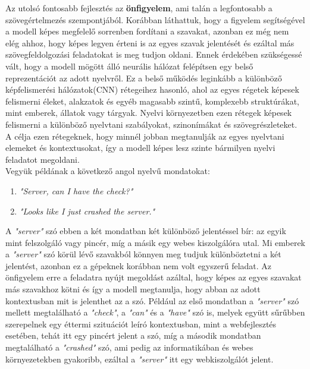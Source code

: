 Az utolsó fontosabb fejlesztés az \textbf{önfigyelem}, ami talán a legfontosabb a szövegértelmezés szempontjából. Korábban láthattuk, hogy a figyelem segítségével a modell képes megfelelő sorrenben fordítani a szavakat, azonban ez még nem elég ahhoz, hogy képes legyen érteni is az egyes szavak jelentését és ezáltal más szövegfeldolgozási feladatokat is meg tudjon oldani. Ennek érdekében szükségessé vált, hogy a modell mögött álló neurális hálózat felépítsen egy belső reprezentációt az adott nyelvről. Ez a belső működés leginkább a különböző képfelismerési hálózatok(CNN) rétegeihez hasonló, ahol az egyes régetek képesek felismerni éleket, alakzatok és egyéb magasabb szintű, komplexebb struktúrákat, mint emberek, állatok vagy tárgyak. Nyelvi környezetben ezen rétegek képesek felismerni a különböző nyelvtani szabályokat, szinonímákat és szövegrészleteket. A célja ezen rétegeknek, hogy minnél jobban megtanulják az egyes nyelvtani elemeket és kontextusokat, így a modell képes lesz szinte bármilyen nyelvi feladatot megoldani.\\
Vegyük példának a következő angol nyelvű mondatokat:

\begin{enumerate}
\item \textit{"Server, can I have the check?"}
\item \textit{"Looks like I just crashed the server."}
\end{enumerate}

A \textit{"server"} szó ebben a két mondatban két különböző jelentéssel bír: az egyik mint felszolgáló vagy pincér, míg a másik egy webes kiszolgálóra utal. Mi emberek a \textit{"server"} szó körül lévő szavakból könnyen meg tudjuk különböztetni a két jelentést, azonban ez a gépeknek korábban nem volt egyszerű feladat. Az önfigyelem erre a feladatra nyújt megoldást azáltal, hogy képes az egyes szavakat más szavakhoz kötni és így a modell megtanulja, hogy abban az adott kontextusban mit is jelenthet az a szó. Például az első mondatban a \textit{"server"} szó mellett megtalálható a \textit{"check"}, a \textit{"can"} és a \textit{"have"} szó is, melyek együtt sűrűbben szerepelnek egy éttermi szituációt leíró kontextusban, mint a webfejlesztés esetében, tehát itt egy pincért jelent a szó, míg a második mondatban megtalálható a \textit{"crashed"} szó, ami pedig az informatikában és webes környezetekben gyakoribb, ezáltal a \textit{"server"} itt egy webkiszolgálót jelent.

